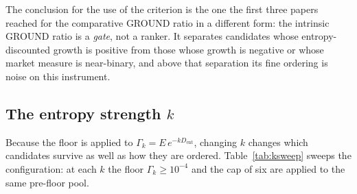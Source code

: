 \documentclass[11pt]{article}
\newcommand{\dent}{D_{\mathrm{ent}}}
\begin{document}
The conclusion for the use of the criterion is the one the first three papers
reached for the comparative GROUND ratio in a different form: the intrinsic
GROUND ratio is a \emph{gate}, not a ranker. It separates candidates whose
entropy-discounted growth is positive from those whose growth is negative or
whose market measure is near-binary, and above that separation its fine
ordering is noise on this instrument.

\subsection{The entropy strength \texorpdfstring{$k$}{k}}
\label{sec:ksweep}

Because the floor is applied to $\Gamma_k = E\,e^{-k\dent}$, changing $k$
changes which candidates survive as well as how they are ordered.
Table~\ref{tab:ksweep} sweeps the configuration: at each $k$ the floor
$\Gamma_k \geq 10^{-4}$ and the cap of six are applied to the same pre-floor
pool.
\end{document}
